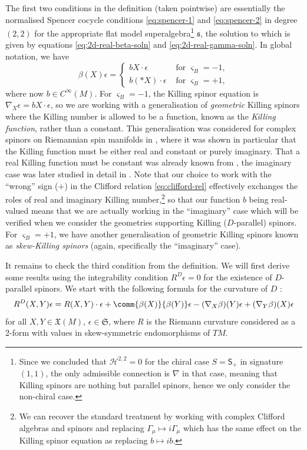 \documentclass[pdftex]{sigma}
\numberwithin{equation}{section}
\newcommand{\fs}{\mathfrak{s}}
\newcommand{\fX}{\mathfrak{X}}
\newcommand{\fS}{\mathfrak{S}}
\newcommand{\cH}{\mathcal{H}}
\newcommand{\ssS}{\mathsf{S}}
\newcommand{\1}{\mathbbm{1}}
\begin{document}
The first two conditions in the definition (taken pointwise) are essentially the normalised Spencer cocycle conditions \eqref{eq:spencer-1} and \eqref{eq:spencer-2} in degree $(2,2)$ for the appropriate flat model superalgebra\footnote{Since we concluded that $\cH^{2,2}=0$ for the chiral case $S=\ssS_+$ in signature $(1,1)$, the only admissible connection is $\nabla$ in that case, meaning that Killing spinors are nothing but parallel spinors, hence we only consider the non-chiral case.} $\fs$, the solution to which is given by equations \eqref{eq:2d-real-beta-soln} and \eqref{eq:2d-real-gamma-soln}. In global notation, we have
\begin{equation}\label{eq:2d-real-beta}
	\beta(X) \epsilon = \begin{cases}
		b X\cdot \epsilon	& \text{ for } \varsigma_B = -1,\\
		b (*X)\cdot\epsilon	& \text{ for } \varsigma_B = +1,
	\end{cases}
\end{equation}
where now $b\in C^\infty(M)$. For $\varsigma_B=-1$, the Killing spinor equation is $\nabla_X\epsilon = b X\cdot\epsilon$, so we are working with a generalisation of \emph{geometric} Killing spinors where the Killing number is allowed to be a function, known as the \emph{Killing function}, rather than a constant. This generalisation was considered for complex spinors on Riemannian spin manifolds in \cite{Lichnerowicz1987}, where it was shown in particular that the Killing function must be either real and constant or purely imaginary. That a real Killing function must be constant was already known from \cite{Hijazi1986}, the imaginary case was later studied in detail in \cite{Rademacher1990}. Note that our choice to work with the ``wrong'' sign ($+$) in the Clifford relation \eqref{eq:clifford-rel} effectively exchanges the roles of real and imaginary Killing number,\footnote{We can recover the standard treatment by working with complex Clifford algebras and spinors and replacing $\Gamma_\mu\mapsto i\Gamma_\mu$ which has the same effect on the Killing spinor equation as replacing $b\mapsto ib$.} so that our function $b$ being real-valued means that we are actually working in the ``imaginary'' case which will be verified when we consider the geometries supporting Killing ($D$-parallel) spinors. For $\varsigma_B=+1$, we have another generalisation of geometric Killing spinors known as \emph{skew-Killing spinors} \cite{Habib2012} (again, specifically the ``imaginary'' case).

 It remains to check the third condition from the definition. We will first derive some results using the integrability condition $R^D\epsilon=0$ for the existence of $D$-parallel spinors. We start with the following formula for the curvature of $D$ \cite[equation~(3.2)]{Beckett2024_2}:
\[%
	R^D(X,Y)\epsilon = R(X,Y)\cdot\epsilon + \comm{\beta(X)}{\beta(Y)}\epsilon - (\nabla_X\beta)(Y)\epsilon + (\nabla_Y\beta)(X)\epsilon
\]
for all $X,Y\in\fX(M)$, $\epsilon\in\fS$, where $R$ is the Riemann curvature considered as a 2-form with values in skew-symmetric endomorphisms of $TM$.
\end{document}
